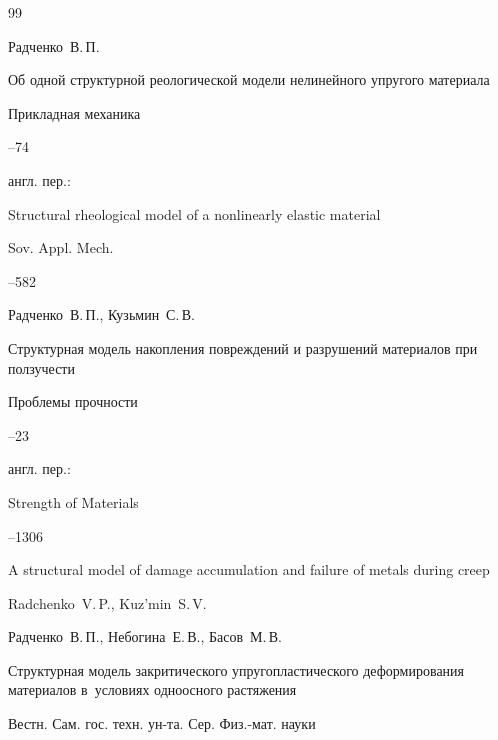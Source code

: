 \begin{thebibliography}{99}

\by Радченко~В.\,П.

\paper Об одной структурной реологической модели нелинейного упругого материала

\jour Прикладная механика




--74

\transl англ. пер.:~

\paper Structural rheological model of a nonlinearly elastic material

\jour  Sov. Appl. Mech. 



--582 










\by Радченко~В.\,П., Кузьмин~С.\,В.

\paper Структурная модель накопления повреждений и разрушений материалов при ползучести

\jour Проблемы прочности



--23

\transl англ. пер.:~

\jour Strength of Materials




--1306

\paper A structural model of damage accumulation and failure of metals during creep

\by Radchenko~V.\,P., Kuz'min~S.\,V.




\by Радченко~В.\,П., Небогина~Е.\,В., Басов~М.\,В.

\paper Структурная модель закритического упругопластического деформирования материалов в~условиях одноосного растяжения

\jour Вестн. Сам. гос. техн. ун-та. Сер. Физ.-мат. науки


\end{thebibliography}

